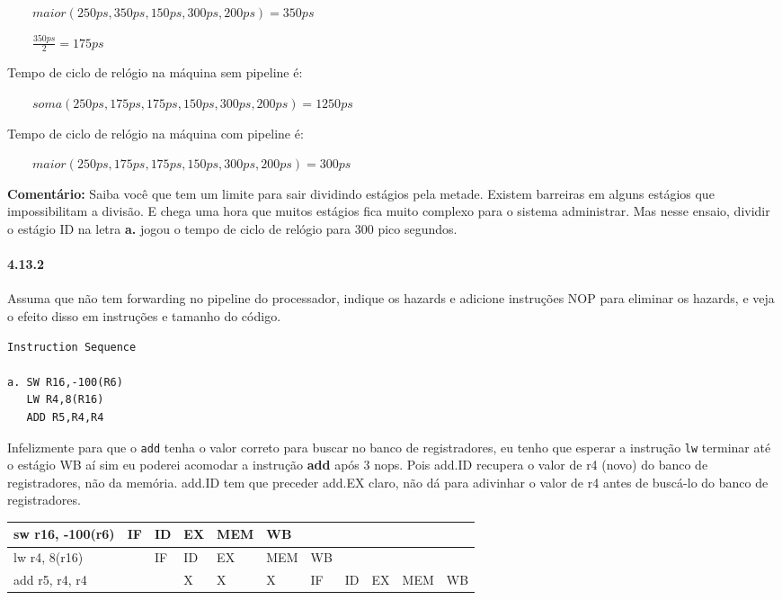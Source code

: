 \documentclass{article}
\begin{document}
$\qquad maior(250ps, 350ps, 150ps, 300ps, 200ps) = 350ps$

$\qquad \frac{350ps}{2} = 175ps$

Tempo de ciclo de relógio na máquina sem pipeline é:

$\qquad soma(250ps,175ps,175ps,150ps,300ps,200ps) = 1250ps$

Tempo de ciclo de relógio na máquina com pipeline é:

$\qquad maior(250ps, 175ps, 175ps, 150ps, 300ps, 200ps) = 300ps$

\textbf{Comentário:} Saiba você que tem um limite para sair dividindo estágios
pela metade. Existem barreiras em alguns estágios que impossibilitam a divisão.
E chega uma hora que muitos estágios fica muito complexo para o sistema
administrar. Mas nesse ensaio, dividir o estágio ID na letra \textbf{a.} jogou o
tempo de ciclo de relógio para 300 pico segundos.

\paragraph{4.13.2} Assuma que não tem forwarding no pipeline do processador, 
indique os hazards e adicione instruções NOP para eliminar os hazards, e veja o 
efeito disso em instruções e tamanho do código.

\begin{verbatim}
Instruction Sequence

a. SW R16,-100(R6)
   LW R4,8(R16)
   ADD R5,R4,R4
\end{verbatim}

Infelizmente para que o \verb|add| tenha o valor correto para buscar no banco 
de registradores, eu tenho que esperar a instrução \verb|lw| terminar até o 
estágio WB aí sim eu poderei acomodar a instrução \textbf{add} após 3 nops. 
Pois add.ID recupera o valor de r4 (novo) do banco de registradores, não da 
memória. add.ID tem que preceder add.EX claro, não dá para adivinhar o valor de 
r4 antes de buscá-lo do banco de registradores.

\begin{tabular}{|l|l|l|l|l|l|l|l|l|l|l|}
\hline sw r16, -100(r6) & IF& ID& EX& MEM&  WB&   &   &   &    &   \\
\hline lw r4, 8(r16)    &   & IF& ID&  EX& MEM& WB&   &   &    &   \\
\hline add r5, r4, r4   &   &   &  X&   X&   X& IF& ID& EX& MEM& WB\\
\hline
\end{tabular}
\end{document}
